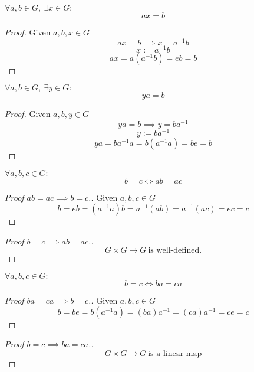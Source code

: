 \begin{proposition}[\(ax = b\)]
   \(\forall a, b \in G,~\exists x \in G:\)
   \[ax = b\]
\end{proposition}
\begin{proof}
   Given \(a, b, x \in G\)
   \[ax = b \implies x = a^{-1}b\]
   \[x := a^{-1}b\]
   \[ax = a(a^{-1}b) = eb = b\]
\end{proof}

\begin{proposition}[\(ya = b\)]
   \(\forall a, b \in G,~\exists y \in G:\)
   \[ya = b\]
\end{proposition}
\begin{proof}
   Given \(a, b, y \in G\)
   \[ya = b \implies y = ba^{-1}\]
   \[y := ba^{-1}\]
   \[ya = ba^{-1}a = b(a^{-1}a) = be = b\]
\end{proof}

\begin{proposition}[\(ab = ac\)]
   \(\forall a, b, c \in G:\)
   \[b = c \iff ab = ac\]
\end{proposition}
\begin{proof}[Proof \(ab = ac \implies b = c\).]
   Given \(a, b, c \in G\)
   \[b = eb = (a^{-1}a)b = a^{-1}(ab) = a^{-1}(ac) = ec = c\]
\end{proof}
\begin{proof}[Proof \(b = c \implies ab = ac\).]
   \[G \times G \to G~\text{is well-defined.}\]
\end{proof}

\begin{proposition}[\(ba = ca\)]
   \(\forall a, b, c \in G:\)
   \[b = c \iff ba = ca\]
\end{proposition}
\begin{proof}[Proof \(ba = ca \implies b = c\).]
   Given \(a, b, c \in G\)
   \[b = be = b(a^{-1}a) = (ba)a^{-1} = (ca)a^{-1} = ce = c\]
\end{proof}
\begin{proof}[Proof \(b = c \implies ba = ca\).]
   \[G \times G \to G~\text{is a linear map}\]
\end{proof}
